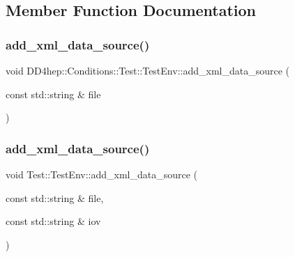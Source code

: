 \subsection{Member Function Documentation}
\hypertarget{struct_d_d4hep_1_1_conditions_1_1_test_1_1_test_env_acad16b889cd6bbf38177f59e34ec8631}{}\label{struct_d_d4hep_1_1_conditions_1_1_test_1_1_test_env_acad16b889cd6bbf38177f59e34ec8631} 
\subsubsection{\texorpdfstring{add\+\_\+xml\+\_\+data\+\_\+source()}{add\_xml\_data\_source()}\hspace{0.1cm}{\footnotesize\ttfamily [1/2]}}
{\footnotesize\ttfamily void D\+D4hep\+::\+Conditions\+::\+Test\+::\+Test\+Env\+::add\+\_\+xml\+\_\+data\+\_\+source (\begin{DoxyParamCaption}\item[{const std\+::string \&}]{file }\end{DoxyParamCaption})}

\hypertarget{struct_d_d4hep_1_1_conditions_1_1_test_1_1_test_env_a4ab672dbbb8f7eedbb3cbb62439fd29b}{}\label{struct_d_d4hep_1_1_conditions_1_1_test_1_1_test_env_a4ab672dbbb8f7eedbb3cbb62439fd29b} 
\subsubsection{\texorpdfstring{add\+\_\+xml\+\_\+data\+\_\+source()}{add\_xml\_data\_source()}\hspace{0.1cm}{\footnotesize\ttfamily [2/2]}}
{\footnotesize\ttfamily void Test\+::\+Test\+Env\+::add\+\_\+xml\+\_\+data\+\_\+source (\begin{DoxyParamCaption}\item[{const std\+::string \&}]{file,  }\item[{const std\+::string \&}]{iov }\end{DoxyParamCaption})}



